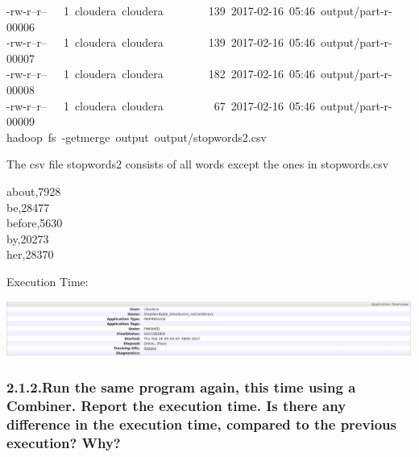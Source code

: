 \documentclass{article}
\begin{document}
\begin{mdpre}
-rw-r--r--~~~{1}~cloudera~cloudera~~~~~~~~{139}~{2017}-{02}-{16}~{05}:{46}~output/part-r-{00006}\\
-rw-r--r--~~~{1}~cloudera~cloudera~~~~~~~~{139}~{2017}-{02}-{16}~{05}:{46}~output/part-r-{00007}\\
-rw-r--r--~~~{1}~cloudera~cloudera~~~~~~~~{182}~{2017}-{02}-{16}~{05}:{46}~output/part-r-{0000}{8}\\
-rw-r--r--~~~{1}~cloudera~cloudera~~~~~~~~~{67}~{2017}-{02}-{16}~{05}:{46}~output/part-r-{0000}{9}\\
hadoop~fs~-getmerge~output~output/stopwords2.csv\\
\end{mdpre}\noindent The csv file stopwords2 consists of all words except the ones in stopwords.csv
\begin{mdpre}%
\noindent about,{7928}\\
be,{28477}\\
before,{5630}\\
by,{20273}\\
her,{28370}%
\end{mdpre}\noindent Execution Time:

\includegraphics[keepaspectratio=true,width=\dimmin{}{\dimwidth{1.30}}]{images/stopwords2}{}%

\subsubsection{2.1.2.\hspace*{0.5em}Run the same program again, this time using a Combiner. Report the execution time. Is there any difference in the execution time, compared to the previous execution? Why?}\label{heading}%
\end{document}
